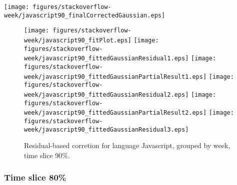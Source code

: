 \begin{center}
{\texttt{[image: figures/stackoverflow-week/javascript90\_finalCorrectedGaussian.eps]}}
\end{center}

\FloatBarrier

\begin{figure}[t]
\centering
{}
{\texttt{[image: figures/stackoverflow-week/javascript90\_fitPlot.eps]}}
{\texttt{[image: figures/stackoverflow-week/javascript90\_fittedGaussianResidual1.eps]}}
{\texttt{[image: figures/stackoverflow-week/javascript90\_fittedGaussianPartialResult1.eps]}}
{\texttt{[image: figures/stackoverflow-week/javascript90\_fittedGaussianResidual2.eps]}}
{\texttt{[image: figures/stackoverflow-week/javascript90\_fittedGaussianPartialResult2.eps]}}
{\texttt{[image: figures/stackoverflow-week/javascript90\_fittedGaussianResidual3.eps]}}
\caption{Residual-based corretion for language Javascript, grouped by week, time slice 90\%.}
\end{figure}


\FloatBarrier


\subsubsection{Time slice 80\%}


